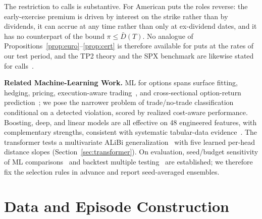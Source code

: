 \documentclass[sigconf,review]{acmart}
\begin{document}
The restriction to calls is substantive. For American puts the roles reverse: the early-exercise premium is driven by interest on the strike rather than by dividends, it can accrue at any time rather than only at ex-dividend dates, and it has no counterpart of the bound $\pi\le\bar D(T)$. No analogue of Propositions~\ref{prop:euro}--\ref{prop:cert} is therefore available for puts at the rates of our test period, and the TP2 theory and the SPX benchmark are likewise stated for calls~\cite{glasserman2026tp2theory,glasserman2025tp2}.

\medskip\noindent\textbf{Related Machine-Learning Work.}
ML for options spans surface fitting, hedging, pricing, execution-aware trading~\cite{kearns2013mlmicrostructure}, and cross-sectional option-return prediction~\cite{bali2023option}; we pose the narrower problem of trade/no-trade classification conditional on a detected violation, scored by realized cost-aware performance. Boosting, deep, and linear models are all effective on 48 engineered features, with complementary strengths, consistent with systematic tabular-data evidence~\cite{grinsztajn2022why,gorishniy2021revisiting}. The transformer tests a multivariate ALiBi generalization~\cite{press2022alibi,shaw2018self} with five learned per-head distance slopes (Section~\ref{sec:transformer}). On evaluation, seed/budget sensitivity of ML comparisons~\cite{melis2018state,lucic2018gans,agarwal2021deep,bouthillier2021accounting,dodge2019show} and backtest multiple testing~\cite{white2000reality,harvey2016crosssection,bailey2014deflated} are established; we therefore fix the selection rules in advance and report seed-averaged ensembles.

\section{Data and Episode Construction}
\label{sec:data}
\end{document}
